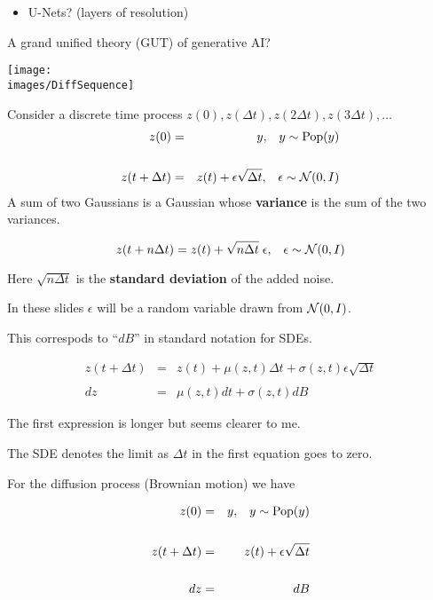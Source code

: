 {\begin{itemize}
\vfill
\item U-Nets? (layers of resolution)
\end{itemize}

\vfill
A grand unified theory (GUT) of generative AI?

\centerline{\texttt{[image: \\images/DiffSequence]}}

Consider a discrete time process $z(0),z(\Delta t),z(2\Delta t),z(3\Delta t),\ldots$
{\huge
\begin{eqnarray*}
  z(0) & = & y,\;\;\;y \sim \mathrm{Pop}(y) \\
  \\
  z(t+\Delta t) & = & z(t) + \epsilon\sqrt{\Delta t},\;\;\;\epsilon \sim {\cal N}(0,I)
\end{eqnarray*}
}
A sum of two Gaussians is a Gaussian whose {\bf variance} is the sum of the two variances.

\vfill
$$z(t+n\Delta t) = z(t) + \sqrt{n\Delta t}\; \epsilon,\;\;\;\epsilon \sim {\cal N}(0,I)$$

\vfill
Here $\sqrt{n \Delta t}$ is the {\bf standard deviation} of the added noise.

In these slides $\epsilon$ will be a random variable drawn from ${\cal N}(0,I)$.

\vfill
This correspods to ``$dB$'' in standard notation for SDEs.

\vfill
{\huge
\begin{eqnarray*}
  z(t+\Delta t) & = & z(t) + \mu(z,t)\Delta t + \sigma(z,t)\epsilon\sqrt{\Delta t} \\
  \\
  dz & = & \mu(z,t)dt + \sigma(z,t)dB
\end{eqnarray*}
}

\vfill
The first expression is longer but seems clearer to me.

\vfill
The SDE denotes the limit as $\Delta t$ in the first equation goes to zero.


\vfill
For the diffusion process (Brownian motion) we have

\vfill
{\huge
\begin{eqnarray}
  z(0) & = & y,\;\;\;y \sim \mathrm{Pop}(y) \nonumber \\
  \nonumber \\
  z(t+\Delta t) & = & z(t) + \epsilon\sqrt{\Delta t} \label{forward} \\
  \nonumber \\
  dz & = & dB \nonumber
\end{eqnarray}
}

}
